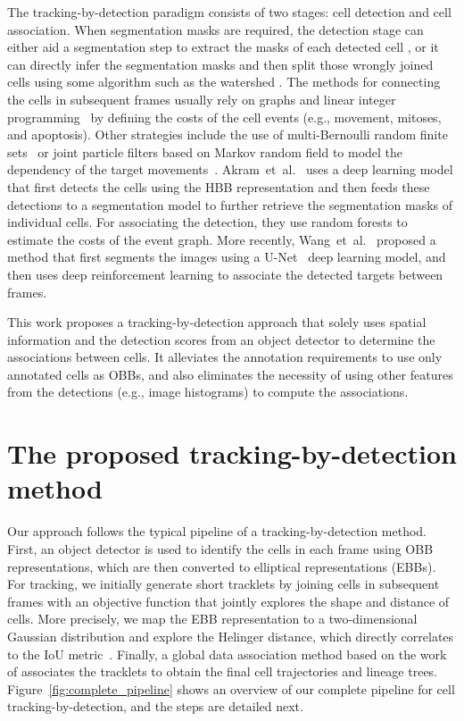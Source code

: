 \documentclass{article}
\begin{document}
The tracking-by-detection paradigm consists of two stages: cell detection and cell association. When segmentation masks are required, the detection stage can either aid a segmentation step to extract the masks of each detected cell \cite{cpn}, or it can directly infer the segmentation masks and then split those wrongly joined cells using some algorithm such as the watershed \cite{kth,boukari2018automated,epflheid,blob,unet,gcme}. The methods for connecting the cells in subsequent frames usually rely on graphs and linear integer programming~\cite{kth,boukari2018automated,epflheid,blob,cpn} by defining the costs of the cell events (e.g., movement, mitoses, and apoptosis). 
Other strategies include the use of multi-Bernoulli random finite sets~\cite{xu2019automated} or joint particle filters based on Markov random field to model the dependency of the target movements~\cite{hirose2017spf}.
Akram~et~al.~\cite{cpn} uses a deep learning model that first detects the cells using the HBB representation and then feeds these detections to a segmentation model to further retrieve the segmentation masks of individual cells. For associating the detection, they use random forests to estimate the costs of the event graph. More recently, Wang~et~al.~\cite{drl} proposed a method that first segments the images using a U-Net~\cite{unet} deep learning model, and then uses deep reinforcement learning to associate the detected targets between frames.

This work proposes a tracking-by-detection approach that solely uses spatial information and the detection scores from an object detector to determine the associations between cells. It alleviates the annotation requirements to use only annotated cells as OBBs, and also eliminates the necessity of using other features from the detections (e.g., image histograms) to compute the associations.


\section{The proposed tracking-by-detection method}\label{sec:method}

Our approach follows the typical pipeline of a tracking-by-detection method. First, an object detector is used to identify the cells in each frame using OBB representations, which are then converted to elliptical representations (EBBs). For tracking, we initially generate short tracklets by joining cells in subsequent frames with an objective function that jointly explores the shape and distance of cells. More precisely, we map the EBB representation to a two-dimensional Gaussian distribution and explore the Helinger distance, which directly correlates to the IoU metric~\cite{probiou}. Finally, a global data association method based on the work of \cite{bise} associates the tracklets to obtain the final cell trajectories and lineage trees. Figure~\ref{fig:complete_pipeline} shows an overview of our complete pipeline for cell tracking-by-detection, and the steps are detailed next.
\end{document}
